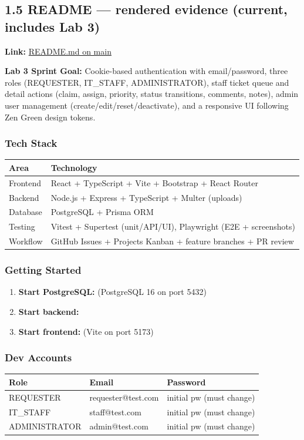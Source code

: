 \documentclass[11pt,a4paper]{article}
\begin{document}
\subsection*{1.5 README --- rendered evidence (current, includes Lab 3)}
\textbf{Link:} \href{https://github.com/thhanabun/Software\_Eng\_Lab/blob/main/README.md}{README.md on main}

\noindent\textbf{Lab 3 Sprint Goal:} Cookie-based authentication with email/password, three roles (REQUESTER, IT\_STAFF, ADMINISTRATOR), staff ticket queue and detail actions (claim, assign, priority, status transitions, comments, notes), admin user management (create/edit/reset/deactivate), and a responsive UI following Zen Green design tokens.

\subsubsection*{Tech Stack}
\begin{longtable}{@{} l l @{}}
\toprule
\textbf{Area} & \textbf{Technology} \\
\midrule
Frontend & React + TypeScript + Vite + Bootstrap + React Router \\
Backend & Node.js + Express + TypeScript + Multer (uploads) \\
Database & PostgreSQL + Prisma ORM \\
Testing & Vitest + Supertest (unit/API/UI), Playwright (E2E + screenshots) \\
Workflow & GitHub Issues + Projects Kanban + feature branches + PR review \\
\bottomrule
\end{longtable}

\subsubsection*{Getting Started}
\begin{enumerate}
\item \textbf{Start PostgreSQL:}  (PostgreSQL 16 on port 5432)
\item \textbf{Start backend:} 
\item \textbf{Start frontend:}  (Vite on port 5173)
\end{enumerate}

\subsubsection*{Dev Accounts}
\begin{longtable}{@{} l l l @{}}
\toprule
\textbf{Role} & \textbf{Email} & \textbf{Password} \\
\midrule
REQUESTER & requester@test.com & initial pw (must change) \\
IT\_STAFF & staff@test.com & initial pw (must change) \\
ADMINISTRATOR & admin@test.com & initial pw (must change) \\
\bottomrule
\end{longtable}
\end{document}
